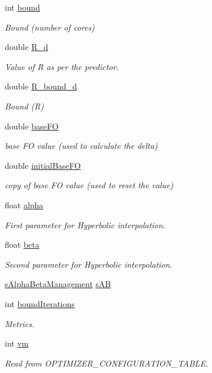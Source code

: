 \begin{DoxyCompactItemize}
int \hyperlink{classApplication_a6e91bef9d503af0e8ba38c8f445c8cb0}{bound}
\begin{DoxyCompactList}\small\item\em Bound (number of cores) \end{DoxyCompactList}\item 
double \hyperlink{classApplication_a374d43f68ae27aaed98278e8152a434c}{R\-\_\-d}
\begin{DoxyCompactList}\small\item\em Value of R as per the predictor. \end{DoxyCompactList}\item 
double \hyperlink{classApplication_a32da2e06513ef910601d75eb89bb528b}{R\-\_\-bound\-\_\-d}
\begin{DoxyCompactList}\small\item\em Bound (R) \end{DoxyCompactList}\item 
double \hyperlink{classApplication_aa703e7525d446d98b5cd51c959d35998}{base\-F\-O}
\begin{DoxyCompactList}\small\item\em base F\-O value (used to calculate the delta) \end{DoxyCompactList}\item 
double \hyperlink{classApplication_a95fd54cbed658fb23ce27939666c91d2}{initial\-Base\-F\-O}
\begin{DoxyCompactList}\small\item\em copy of base F\-O value (used to reset the value) \end{DoxyCompactList}\item 
float \hyperlink{classApplication_a087ef34a09792f2954940324dcea20d6}{alpha}
\begin{DoxyCompactList}\small\item\em First parameter for Hyperbolic interpolation. \end{DoxyCompactList}\item 
float \hyperlink{classApplication_a7c74ef816a425a4115005d15d01ac9c6}{beta}
\begin{DoxyCompactList}\small\item\em Second parameter for Hyperbolic interpolation. \end{DoxyCompactList}\item 
\hyperlink{classsAlphaBetaManagement}{s\-Alpha\-Beta\-Management} \hyperlink{classApplication_a6bbd698f2df7c4cedb9fb46fce23dbfe}{s\-A\-B}
\item 
int \hyperlink{classApplication_a6a3692743eccba602a58fdfc3f23950b}{bound\-Iterations}
\begin{DoxyCompactList}\small\item\em Metrics. \end{DoxyCompactList}\item 
int \hyperlink{classApplication_a0a3fe386eb8244e536bc5297709d1269}{vm}
\begin{DoxyCompactList}\small\item\em Read from O\-P\-T\-I\-M\-I\-Z\-E\-R\-\_\-\-C\-O\-N\-F\-I\-G\-U\-R\-A\-T\-I\-O\-N\-\_\-\-T\-A\-B\-L\-E. \end{DoxyCompactList}\end{DoxyCompactItemize}


